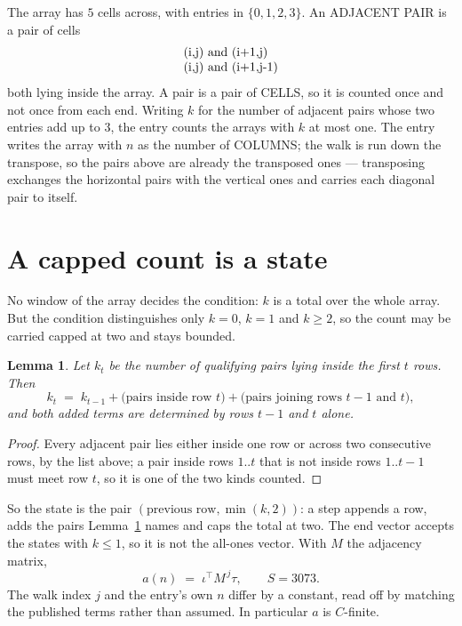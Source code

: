 \documentclass[11pt,a4paper]{article}
\theoremstyle{plain}
\newtheorem{lemma}[theorem]{Lemma}
\theoremstyle{definition}
\begin{document}
The array has $5$ cells across, with entries in $\{0,1,2,3\}$. An ADJACENT PAIR is a pair of cells
\[
\begin{array}{l}
$(i,j)\text{ and }(i{+}1,j)$ \\
$(i,j)\text{ and }(i{+}1,j{-}1)$ \\
\end{array}
\]
both lying inside the array. A pair is a pair of CELLS, so it is counted once and not once from
each end. Writing $k$ for the number of adjacent pairs whose two entries add up to $3$, the
entry counts the arrays with $k$ at most one. The entry writes the array with $n$ as the number of COLUMNS; the walk is run down the transpose, so the pairs above are already the transposed ones --- transposing exchanges the horizontal pairs with the vertical ones and carries each diagonal pair to itself.

\section{A capped count is a state}

No window of the array decides the condition: $k$ is a total over the whole array. But the
condition distinguishes only $k=0$, $k=1$ and $k\ge2$, so the count may be carried capped at
two and stays bounded.

\begin{lemma}\label{lem:cap}
Let $k_t$ be the number of qualifying pairs lying inside the first $t$ rows. Then
\[
k_{t}\;=\;k_{t-1}+\bigl(\text{pairs inside row } t\bigr)
+\bigl(\text{pairs joining rows } t-1 \text{ and } t\bigr),
\]
and both added terms are determined by rows $t-1$ and $t$ alone.
\end{lemma}

\begin{proof}
Every adjacent pair lies either inside one row or across two consecutive rows, by the list
above; a pair inside rows $1..t$ that is not inside rows $1..t-1$ must meet row $t$, so it is
one of the two kinds counted.
\end{proof}

So the state is the pair $(\text{previous row},\min(k,2))$: a step appends a row, adds the
pairs Lemma~\ref{lem:cap} names and caps the total at two. The end vector accepts the states
with $k\le1$, so it is not the all-ones vector. With $M$ the adjacency matrix,
\[
a(n)\;=\;\iota^{\!\top}M^{\,j}\tau ,\qquad S=3073.
\]
The walk index $j$ and the entry's own $n$ differ by a constant, read off by matching the
published terms rather than assumed. In particular $a$ is $C$-finite.
\end{document}
